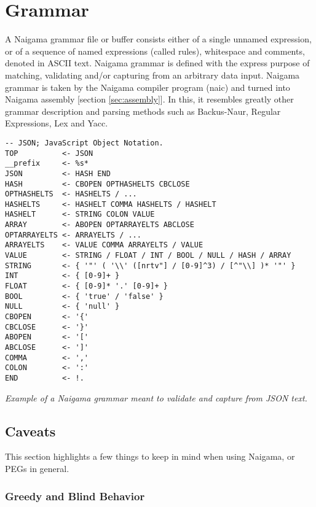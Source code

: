 \section{Grammar}
\label{sec:grammar}

A Naigama grammar file or buffer consists either of a single
unnamed expression, or of a sequence of named expressions (called rules),
whitespace and comments, denoted in ASCII text.
Naigama grammar is defined with the express purpose of matching, validating
and/or capturing from an arbitrary data input.
Naigama grammar is taken by the Naigama compiler program (naic) and turned
into Naigama assembly [section \ref{sec:assembly}].
In this, it resembles greatly other grammar description and parsing methods
such as Backus-Naur, Regular Expressions, Lex and Yacc.

\begin{myquote}
\begin{verbatim}
-- JSON; JavaScript Object Notation.
TOP          <- JSON
__prefix     <- %s*
JSON         <- HASH END
HASH         <- CBOPEN OPTHASHELTS CBCLOSE
OPTHASHELTS  <- HASHELTS / ...
HASHELTS     <- HASHELT COMMA HASHELTS / HASHELT
HASHELT      <- STRING COLON VALUE
ARRAY        <- ABOPEN OPTARRAYELTS ABCLOSE
OPTARRAYELTS <- ARRAYELTS / ...
ARRAYELTS    <- VALUE COMMA ARRAYELTS / VALUE
VALUE        <- STRING / FLOAT / INT / BOOL / NULL / HASH / ARRAY
STRING       <- { '"' ( '\\' ([nrtv"] / [0-9]^3) / [^"\\] )* '"' }
INT          <- { [0-9]+ }
FLOAT        <- { [0-9]* '.' [0-9]+ }
BOOL         <- { 'true' / 'false' }
NULL         <- { 'null' }
CBOPEN       <- '{'
CBCLOSE      <- '}'
ABOPEN       <- '['
ABCLOSE      <- ']'
COMMA        <- ','
COLON        <- ':'
END          <- !.
\end{verbatim}
\end{myquote}
\textit{Example of a Naigama grammar meant to validate and capture from
JSON\cite{bib:json} text.}

\subsection{Caveats}

This section highlights a few things to keep in mind when using
Naigama, or PEGs in general.

\subsubsection{Greedy and Blind Behavior}

